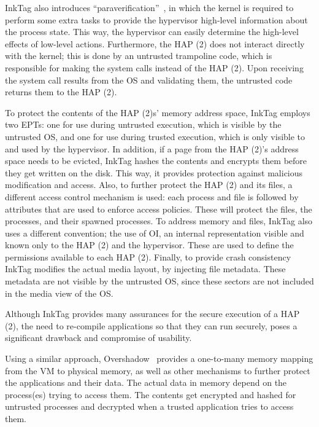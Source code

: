 \par InkTag also introduces ``paraverification''~\cite{hofmann2013inktag}, in which the kernel is required to perform some extra tasks to provide the hypervisor high-level information about the process state. This way, the hypervisor can easily determine the high-level effects of low-level actions. Furthermore, the \ac{HAP (2)} does not interact directly with the kernel; this is done by an untrusted trampoline code, which is responsible for making the system calls instead of the \ac{HAP (2)}. Upon receiving the system call results from the \ac{OS} and validating them, the untrusted code returns them to the \ac{HAP (2)}.

\par To protect the contents of the \ac{HAP (2)}s' memory address space, InkTag employs two \acp{EPT}: one for use during untrusted execution, which is visible by the untrusted \ac{OS}, and one for use during trusted execution, which is only visible to and used by the hypervisor. In addition, if a page from the \ac{HAP (2)}'s address space needs to be evicted, InkTag hashes the contents and encrypts them before they get written on the disk. This way, it provides protection against malicious modification and access.
Also, to further protect the \ac{HAP (2)} and its files, a different access control mechanism is used: each process and file is followed by attributes that are used to enforce access policies. These will protect the files, the processes, and their spawned processes. To address memory and files, InkTag also uses a different convention; the use of \ac{OI}, an internal representation visible and known only to the \ac{HAP (2)} and the hypervisor. These are used to define the permissions available to each \ac{HAP (2)}.
Finally, to provide crash consistency InkTag modifies the actual media layout, by injecting file metadata. These metadata are not visible by the untrusted \ac{OS}, since these sectors are not included in the media view of the \ac{OS}. 

\par Although InkTag provides many assurances for the secure execution of a \ac{HAP (2)}, the need to re-compile applications so that they can run securely, poses a significant drawback and compromise of usability.

\par Using a similar approach, Overshadow~\cite{chen2008overshadow} provides a one-to-many memory mapping from the \ac{VM} to physical memory, as well as other mechanisms to further protect the applications and their data. The actual data in memory depend on the process(es) trying to access them. The contents get encrypted and hashed for untrusted processes and decrypted when a trusted application tries to access them. 

